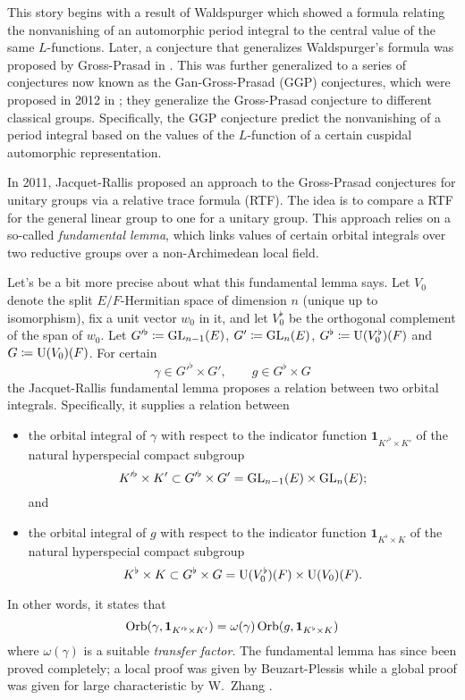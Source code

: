 This story begins with a result of
Waldspurger \cite{ref:waldspurger} which showed a formula
relating the nonvanishing of an automorphic period integral
to the central value of the same $L$-functions.
Later, a conjecture that generalizes Waldspurger's formula
was proposed by Gross-Prasad in \cite{ref:GP1,ref:GP2}.
This was further generalized to a series of conjectures
now known as the Gan-Gross-Prasad (GGP) conjectures,
which were proposed in 2012 in \cite{ref:GGP};
they generalize the Gross-Prasad conjecture to different classical groups.
Specifically, the GGP conjecture predict the nonvanishing of a period integral
based on the values of the $L$-function of a certain cuspidal automorphic representation.

In 2011, Jacquet-Rallis \cite{ref:JR} proposed an approach to the Gross-Prasad conjectures
for unitary groups via a relative trace formula (RTF).
The idea is to compare a RTF for the general linear group to one for a unitary group.
This approach relies on a so-called \emph{fundamental lemma},
which links values of certain orbital integrals
over two reductive groups over a non-Archimedean local field.

Let's be a bit more precise about what this fundamental lemma says.
Let $V_0$ denote the split $E/F$-Hermitian space of dimension $n$ (unique up to isomorphism),
fix a unit vector $w_0$ in it,
and let $V_0^\flat$ be the orthogonal complement of the span of $w_0$.
Let $G'^\flat \coloneqq \operatorname{GL}_{n-1}(E)$, $G' \coloneqq \operatorname{GL}_n(E)$,
$G^\flat \coloneqq \operatorname{U}(V_0^\flat)(F)$ and $G \coloneqq \operatorname{U}(V_0)(F)$.
For certain
\[ \gamma \in G'^\flat \times G', \qquad g \in G^\flat \times G \]
the Jacquet-Rallis fundamental lemma proposes a relation between two orbital integrals.
Specifically, it supplies a relation between
\begin{itemize}
\item the orbital integral of $\gamma$ with respect to
  the indicator function $\mathbf{1}_{K'^\flat \times K'}$
  of the natural hyperspecial compact subgroup
  \[ K'^\flat \times K' \subset G'^\flat \times G' = \operatorname{GL}_{n-1}(E) \times \operatorname{GL}_n(E); \]
  and
\item the orbital integral of $g$ with respect to
  the indicator function $\mathbf{1}_{K^\flat \times K}$
  of the natural hyperspecial compact subgroup
  \[ K^\flat \times K \subset G^\flat \times G = \operatorname{U}(V_0^\flat)(F) \times \operatorname{U}(V_0)(F). \]
\end{itemize}
In other words, it states that
\begin{equation}
  \operatorname{Orb}(\gamma, \mathbf{1}_{K'^\flat \times K'}) = \omega(\gamma) \operatorname{Orb}(g, \mathbf{1}_{K^\flat \times K})
  \label{eq:old_FL}
\end{equation}
where $\omega(\gamma)$ is a suitable \emph{transfer factor}.
The fundamental lemma has since been proved completely;
a local proof was given by Beuzart-Plessis \cite{ref:BeuzartPlessis}
while a global proof was given for large characteristic by W.\ Zhang \cite{ref:Wei2021}.

